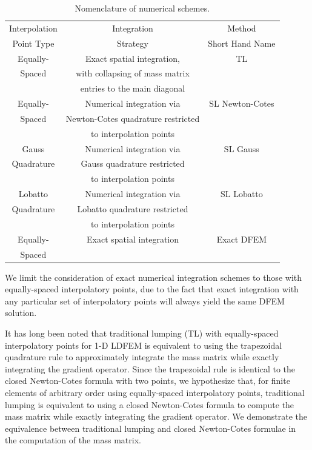 \begin{table}[!htp]
\centering
\caption{Nomenclature of numerical schemes.}
\begin{tabular}{|c|c|c|} 
\hline
  Interpolation &    		Integration			&		Method					\\
  Point Type		&		    Strategy 	    	&		Short Hand Name \\
  \hline
  Equally-  & Exact spatial integration,				& 		TL \\
  Spaced  &  with collapsing of  mass matrix   	&   {}  			\\
  {}			&			entries to the main diagonal		& 	{}				\\
  \hline
  Equally-  & Numerical integration via	  				& SL Newton-Cotes \\
  Spaced   	& Newton-Cotes quadrature	restricted 	& 	{}						\\
  {}				&	to interpolation points							&		{}     				\\
  \hline
  Gauss  			&  	Numerical integration via	  	& SL Gauss 	\\
  Quadrature 	& 	Gauss	quadrature	restricted	&  	{}			\\
    {}				&		to interpolation points  			&    {}  		\\
  \hline
  Lobatto  		& Numerical integration via 			& SL Lobatto \\
  Quadrature 	& Lobatto	quadrature	restricted 	&   {} \\
    {}				&		to interpolation points				&		{}      \\
  \hline
    Equally-  & 		Exact spatial integration 		& Exact DFEM \\
  Spaced   &   		{}											  		&             \\
  \hline
\end{tabular}
\label{tbl:names} 
\end{table}
We limit the consideration of exact numerical integration schemes to those with equally-spaced interpolatory points, due to the fact that 
exact integration with any particular set of interpolatory points will always yield the same DFEM solution.  

It has long been noted that traditional lumping (TL) with equally-spaced interpolatory points for 1-D LDFEM is equivalent to using the trapezoidal quadrature rule to approximately integrate the mass matrix \cite{thomee} while exactly integrating the gradient operator.  
Since the trapezoidal rule is identical to the closed Newton-Cotes formula with two points, we hypothesize that, for finite elements of arbitrary  order using equally-spaced interpolatory points, traditional lumping is  equivalent to using a closed Newton-Cotes formula to compute the mass matrix while exactly integrating  the gradient operator.  
We demonstrate the equivalence between traditional lumping and closed Newton-Cotes formulae in the computation of the mass matrix.

